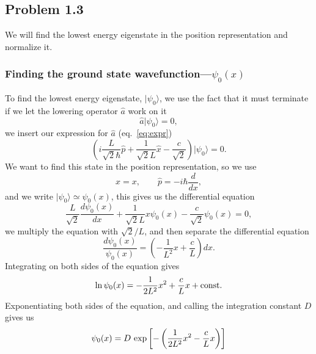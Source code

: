 \documentclass[a4paper, 11pt, titlepage, english]{article}
\newcommand{\ket}[1]{|#1 \rangle}
\newcommand{\op}[1]{\hat{#1}}
\begin{document}
\subsection*{Problem 1.3}
We will find the lowest energy eigenstate in the position representation and normalize it.

\subsubsection*{Finding the ground state wavefunction---$\psi_0(x)$}
To find the lowest energy eigenstate, $\ket{\psi_0}$, we use the fact that it must terminate if we let the lowering operator $\op{a}$ work on it
$$\op{a}\ket{\psi_0} = 0,$$
we insert our expression for $\op{a}$ (eq.\ \ref{eq:expr})
$$ \left( i\frac{L}{\sqrt{2}\hbar}\op{p} + \frac{1}{\sqrt{2}L}\op{x} - \frac{c}{\sqrt{2}} \right) \ket{\psi_0} = 0. $$
We want to find this state in the position representation, so we use
$$\op{x} = x, \qquad \op{p} = -i\hbar\frac{d}{dx},$$
and we write $\ket{\psi_0} \simeq \psi_0(x)$, this gives us the differential equation
$$\frac{L}{\sqrt{2}}\frac{d\psi_0(x)}{dx} + \frac{1}{\sqrt{2}L}x\psi_0(x) - \frac{c}{\sqrt{2}}\psi_0(x) = 0, $$
we multiply the equation with $\sqrt{2}/L$, and then separate the differential equation
$$\frac{d\psi_0(x)}{\psi_0(x)} = \left(-\frac{1}{L^2}x+ \frac{c}{L} \right) dx.$$
Integrating on both sides of the equation gives
$$\ln \psi_0(x) = -\frac{1}{2L^2}x^2 + \frac{c}{L}x + {\rm const.} $$
Exponentiating both sides of the equation, and calling the integration constant $D$ gives us
$$\psi_0(x) = D{\rm\ exp}\left[-\left(\frac{1}{2L^2}x^2 - \frac{c}{L}x\right) \right]$$
\end{document}
